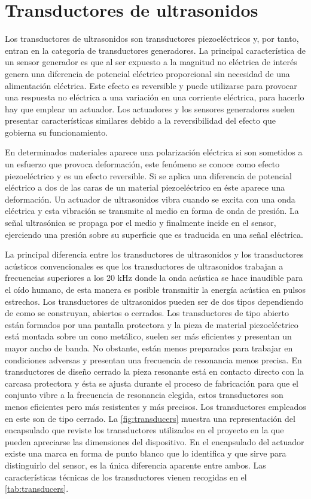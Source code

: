 \section{Transductores de ultrasonidos}\label{sec:transducers}

Los transductores de ultrasonidos son transductores piezoeléctricos y, por
tanto, entran en la categoría de transductores generadores. La principal
característica de un sensor generador es que al ser expuesto a la magnitud
no eléctrica de interés genera una diferencia de potencial eléctrico
proporcional sin necesidad de una alimentación eléctrica. Este efecto es
reversible y puede utilizarse para provocar una respuesta no eléctrica a
una variación en una corriente eléctrica, para hacerlo hay que emplear un
actuador. Los actuadores y los sensores generadores suelen presentar
características similares debido a la reversibilidad del efecto que
gobierna su funcionamiento.

En determinados materiales aparece una polarización eléctrica si son
sometidos a un esfuerzo que provoca deformación, este fenómeno se conoce
como efecto piezoeléctrico y es un efecto reversible. Si se aplica una
diferencia de potencial eléctrico a dos de las caras de un material
piezoeléctrico en éste aparece una deformación. Un actuador de ultrasonidos
vibra cuando se excita con una onda eléctrica y esta vibración se transmite
al medio en forma de onda de presión. La señal ultrasónica se propaga por
el medio y finalmente incide en el sensor, ejerciendo una presión sobre su
superficie que es traducida en una señal eléctrica.

La principal diferencia entre los transductores de ultrasonidos y los
transductores acústicos convencionales es que los transductores de
ultrasonidos trabajan a frecuencias superiores a los 20 kHz donde la onda
acústica se hace inaudible para el oído humano, de esta manera es posible
transmitir la energía acústica en pulsos estrechos. Los transductores de
ultrasonidos pueden ser de dos tipos dependiendo de como se construyan,
abiertos o cerrados. Los transductores de tipo abierto están formados por
una pantalla protectora y la pieza de material piezoeléctrico está montada
sobre un cono metálico, suelen ser más eficientes y presentan un mayor
ancho de banda. No obstante, están menos preparados para trabajar en
condiciones adversas y presentan una frecuencia de resonancia menos
precisa. En transductores de diseño cerrado la pieza resonante está en
contacto directo con la carcasa protectora y ésta se ajusta durante el
proceso de fabricación para que el conjunto vibre a la frecuencia de
resonancia elegida, estos transductores son menos eficientes pero más
resistentes y más precisos. Los transductores empleados en este 
son de tipo cerrado. La \vref{fig:transducers} muestra una representación
del encapsulado que reviste los transductores utilizados en el proyecto en
la que pueden apreciarse las dimensiones del dispositivo. En el encapsulado
del actuador existe una marca en forma de punto blanco que lo identifica y
que sirve para distinguirlo del sensor, es la única diferencia aparente
entre ambos. Las características técnicas de los transductores vienen
recogidas en el \cref{tab:transducers}.

